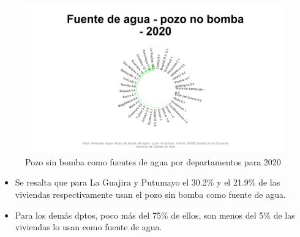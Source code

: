     \begin{figure}[H]
        \caption{Pozo sin bomba como fuentes de agua por departamentos para 2020 \label{map_result_2} }
        \begin{center}
        \includegraphics[width=\textwidth,keepaspectratio]{img/var_137_static.png}
        \end{center}
    \end{figure}
            \begin{itemize}
                    \item Se resalta que para La Guajira y Putumayo el 30.2\% y el 21.9\% de las viviendas respectivamente usan el pozo sin bomba como fuente de agua.
                    \item Para los demás dptos, poco más del 75\% de ellos, son menos del 5\% de las viviendas lo usan como fuente de agua.
                    \end{itemize}

